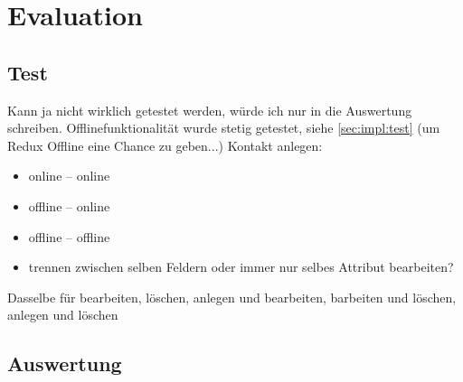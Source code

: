 \chapter{\label{chap:evaluation}Evaluation}
\section{Test}
Kann ja nicht wirklich getestet werden, würde ich nur in die Auswertung schreiben.
Offlinefunktionalität wurde stetig getestet, siehe \ref{sec:impl:test}
(um Redux Offline eine Chance zu geben...)
Kontakt anlegen:
\begin{itemize}
	\item online -- online
	\item offline -- online
	\item offline -- offline
	\item trennen zwischen selben Feldern oder immer nur selbes Attribut bearbeiten?
\end{itemize}
Dasselbe für bearbeiten, löschen,
anlegen und bearbeiten, barbeiten und löschen, anlegen und löschen\\

%
%
\section{Auswertung}

%
